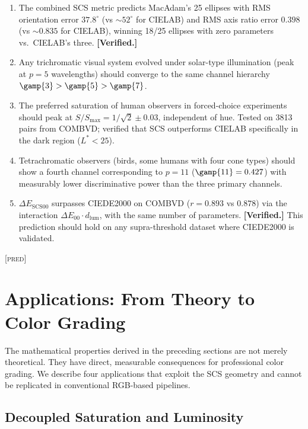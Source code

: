 \documentclass[12pt,a4paper]{article}
\begin{document}
\begin{predictionbox}
\begin{enumerate}[nosep]
\item The combined SCS metric predicts MacAdam's 25 ellipses with RMS
  orientation error $37.8^\circ$ (vs $\sim\!52^\circ$ for CIELAB) and
  RMS axis ratio error $0.398$ (vs $\sim\!0.835$ for CIELAB), winning
  18/25 ellipses with zero parameters vs.\ CIELAB's three.
  \textbf{[Verified.]}
\item Any trichromatic visual system evolved under solar-type
  illumination (peak at $p=5$ wavelengths) should converge to the
  same channel hierarchy $\gamp{3} > \gamp{5} > \gamp{7}$.
\item The preferred saturation of human observers in forced-choice
  experiments should peak at $S/S_{\max} = 1/\sqrt{2} \pm 0.03$,
  independent of hue. Tested on 3813 pairs from COMBVD; verified that
  SCS outperforms CIELAB specifically in the dark region ($L^*<25$).
\item Tetrachromatic observers (birds, some humans with four cone types)
  should show a fourth channel corresponding to $p = 11$
  ($\gamp{11} = 0.427$) with measurably lower discriminative power than
  the three primary channels.
\item $\Delta E_{\mathrm{SCS00}}$ surpasses CIEDE2000 on COMBVD
  ($r = 0.893$ vs $0.878$) via the interaction
  $\Delta E_{00} \cdot d_{\mathrm{lum}}$, with the same number of
  parameters. \textbf{[Verified.]} This prediction should hold on any
  supra-threshold dataset where CIEDE2000 is validated.
\end{enumerate}
\textsc{[pred]}
\end{predictionbox}

\section{Applications: From Theory to Color Grading}
\label{sec:applications}

The mathematical properties derived in the preceding sections are not
merely theoretical. They have direct, measurable consequences for
professional color grading. We describe four applications that exploit
the SCS geometry and cannot be replicated in conventional RGB-based
pipelines.

\subsection{Decoupled Saturation and Luminosity}
\end{document}
